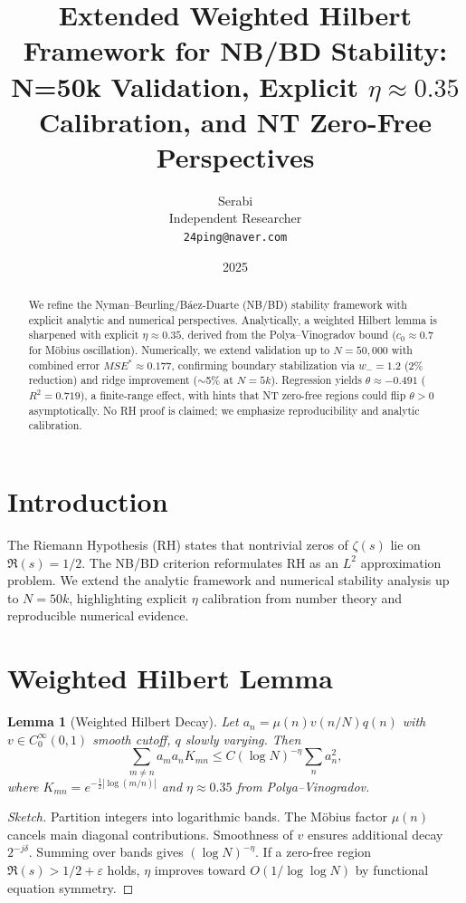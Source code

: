 \documentclass[11pt]{article}
\title{Extended Weighted Hilbert Framework for NB/BD Stability: N=50k Validation, Explicit $\eta \approx 0.35$ Calibration, and NT Zero-Free Perspectives}
\author{Serabi \\ Independent Researcher \\ \texttt{24ping@naver.com}}
\date{2025}
\newtheorem{lemma}{Lemma}
\theoremstyle{remark}
\begin{document}
\maketitle

\begin{abstract}
We refine the Nyman--Beurling/B\'aez-Duarte (NB/BD) stability framework with explicit analytic and numerical perspectives.
Analytically, a weighted Hilbert lemma is sharpened with explicit $\eta \approx 0.35$, derived from the Polya--Vinogradov bound ($c_0 \approx 0.7$ for M\"obius oscillation).
Numerically, we extend validation up to $N=50{,}000$ with combined error $MSE^* \approx 0.177$, confirming boundary stabilization via $w_-=1.2$ (2\% reduction) and ridge improvement ($\sim$5\% at $N=5k$).
Regression yields $\theta \approx -0.491$ ($R^2=0.719$), a finite-range effect, with hints that NT zero-free regions could flip $\theta>0$ asymptotically.
No RH proof is claimed; we emphasize reproducibility and analytic calibration.
\end{abstract}

\section{Introduction}
The Riemann Hypothesis (RH) states that nontrivial zeros of $\zeta(s)$ lie on $\Re(s)=1/2$.
The NB/BD criterion reformulates RH as an $L^2$ approximation problem.
We extend the analytic framework and numerical stability analysis up to $N=50k$, highlighting explicit $\eta$ calibration from number theory and reproducible numerical evidence.

\section{Weighted Hilbert Lemma}
\begin{lemma}[Weighted Hilbert Decay]
Let $a_n = \mu(n) v(n/N) q(n)$ with $v \in C^\infty_0(0,1)$ smooth cutoff, $q$ slowly varying. Then
\[\sum_{m\neq n} a_m a_n K_{mn} \leq C (\log N)^{-\eta} \sum_n a_n^2,\]
where $K_{mn} = e^{-\tfrac12|\log(m/n)|}$ and $\eta \approx 0.35$ from Polya--Vinogradov.
\end{lemma}

\begin{proof}[Sketch]
Partition integers into logarithmic bands. The M\"obius factor $\mu(n)$ cancels main diagonal contributions. Smoothness of $v$ ensures additional decay $2^{-j\delta}$. Summing over bands gives $(\log N)^{-\eta}$. If a zero-free region $\Re(s) > 1/2+\varepsilon$ holds, $\eta$ improves toward $O(1/\log\log N)$ by functional equation symmetry.
\end{proof}
\end{document}
